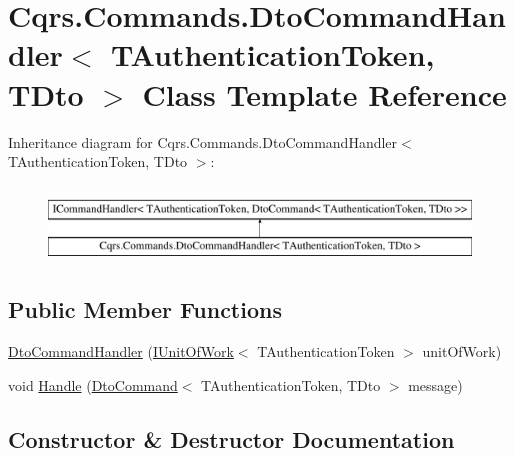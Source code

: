 \hypertarget{classCqrs_1_1Commands_1_1DtoCommandHandler}{}\section{Cqrs.\+Commands.\+Dto\+Command\+Handler$<$ T\+Authentication\+Token, T\+Dto $>$ Class Template Reference}
\label{classCqrs_1_1Commands_1_1DtoCommandHandler}
Inheritance diagram for Cqrs.\+Commands.\+Dto\+Command\+Handler$<$ T\+Authentication\+Token, T\+Dto $>$\+:\begin{figure}[H]
\begin{center}
\leavevmode
\includegraphics[height=2.000000cm]{classCqrs_1_1Commands_1_1DtoCommandHandler}
\end{center}
\end{figure}
\subsection*{Public Member Functions}
\begin{DoxyCompactItemize}
\item 
\hyperlink{classCqrs_1_1Commands_1_1DtoCommandHandler_aaff94627552cf26c503c628eb49adb60}{Dto\+Command\+Handler} (\hyperlink{interfaceCqrs_1_1Domain_1_1IUnitOfWork}{I\+Unit\+Of\+Work}$<$ T\+Authentication\+Token $>$ unit\+Of\+Work)
\item 
void \hyperlink{classCqrs_1_1Commands_1_1DtoCommandHandler_a344c5d909b31fe7ad6b81c69ab569fc8}{Handle} (\hyperlink{classCqrs_1_1Commands_1_1DtoCommand}{Dto\+Command}$<$ T\+Authentication\+Token, T\+Dto $>$ message)
\end{DoxyCompactItemize}


\subsection{Constructor \& Destructor Documentation}
\mbox{\label{classCqrs_1_1Commands_1_1DtoCommandHandler_aaff94627552cf26c503c628eb49adb60}} 
